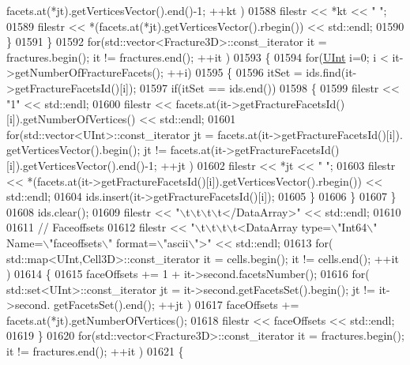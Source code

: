 \begin{DoxyCode}
      facets.at(*jt).getVerticesVector().end()-1; ++kt )
01588                 filestr << *kt << \textcolor{stringliteral}{" "};
01589             filestr << *(facets.at(*jt).getVerticesVector().rbegin()) << std::endl;
01590         \}
01591     \}
01592     \textcolor{keywordflow}{for}(std::vector<Fracture3D>::const\_iterator it = fractures.begin(); it != fractures.end(); ++it )
01593     \{
01594         \textcolor{keywordflow}{for}(\hyperlink{namespaceFVCode3D_a4bf7e328c75d0fd504050d040ebe9eda}{UInt} i=0; i < it->getNumberOfFractureFacets(); ++i)
01595         \{
01596             itSet = ids.find(it->getFractureFacetsId()[i]);
01597             \textcolor{keywordflow}{if}(itSet == ids.end())
01598             \{
01599                 filestr << \textcolor{stringliteral}{"1"} << std::endl;
01600                 filestr << facets.at(it->getFractureFacetsId()[i]).getNumberOfVertices() << std::endl;
01601                 \textcolor{keywordflow}{for}(std::vector<UInt>::const\_iterator jt = facets.at(it->getFractureFacetsId()[i]).
      getVerticesVector().begin(); jt != facets.at(it->getFractureFacetsId()[i]).getVerticesVector().end()-1; ++jt )
01602                     filestr << *jt << \textcolor{stringliteral}{" "};
01603                 filestr << *(facets.at(it->getFractureFacetsId()[i]).getVerticesVector().rbegin()) << 
      std::endl;
01604                 ids.insert(it->getFractureFacetsId()[i]);
01605             \}
01606         \}
01607     \}
01608     ids.clear();
01609     filestr << \textcolor{stringliteral}{"\(\backslash\)t\(\backslash\)t\(\backslash\)t\(\backslash\)t</DataArray>"} << std::endl;
01610 
01611     \textcolor{comment}{//  Faceoffsets}
01612     filestr << \textcolor{stringliteral}{"\(\backslash\)t\(\backslash\)t\(\backslash\)t\(\backslash\)t<DataArray type=\(\backslash\)"Int64\(\backslash\)" Name=\(\backslash\)"faceoffsets\(\backslash\)" format=\(\backslash\)"ascii\(\backslash\)">"} << std::endl;
01613     \textcolor{keywordflow}{for}( std::map<UInt,Cell3D>::const\_iterator it = cells.begin(); it != cells.end(); ++it )
01614     \{
01615         faceOffsets += 1 + it->second.facetsNumber();
01616         \textcolor{keywordflow}{for}( std::set<UInt>::const\_iterator jt = it->second.getFacetsSet().begin(); jt != it->second.
      getFacetsSet().end(); ++jt )
01617             faceOffsets += facets.at(*jt).getNumberOfVertices();
01618         filestr << faceOffsets << std::endl;
01619     \}
01620     \textcolor{keywordflow}{for}(std::vector<Fracture3D>::const\_iterator it = fractures.begin(); it != fractures.end(); ++it )
01621     \{

\end{DoxyCode}
